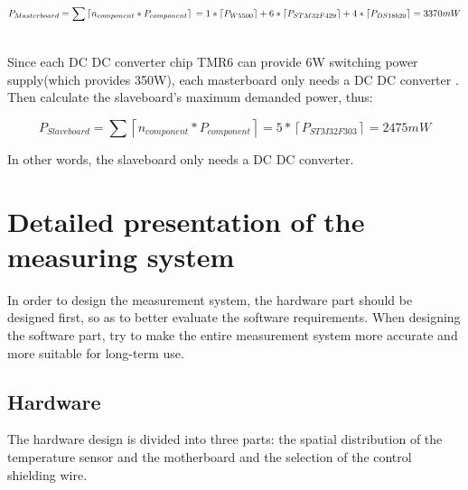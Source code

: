\begin{center} 
\begin{equation}
P_{Masterboard} = \sum \left \lceil n_{component}*P_{component}\right \rceil 
\\
=1*\left \lceil P_{W5500}  \right \rceil +6* \left \lceil P_{STM32F429}  \right \rceil+ 4* \left \lceil P_{DS18b20}\right \rceil = 3370mW
\end{equation}
\end{center}
\\
Since each DC DC converter chip TMR6 can provide 6W switching power supply(which provides 350W), each masterboard only needs a DC DC converter \cite{TMR6datasheet}. 
Then calculate the slaveboard’s maximum demanded power, thus: 
\begin{center} 
\begin{equation}
P_{Slaveboard} = \sum \left \lceil n_{component}*P_{component}\right \rceil=5* \left \lceil P_{STM32F303}  \right \rceil= 2475mW
\end{equation}
\end{center}
In other words, the slaveboard only needs a DC DC converter.

\chapter{Detailed presentation of the measuring system}
\label{chap:Detailed presentation of the measuring system}
In order to design the measurement system, the hardware part should be designed first, so as to better evaluate the software requirements. When designing the software part, try to make the entire measurement system more accurate and more suitable for long-term use.

\section{Hardware}
\label{sec:Hardware}
The hardware design is divided into three parts: the spatial distribution of the temperature sensor and the motherboard and the selection of the control shielding wire.
